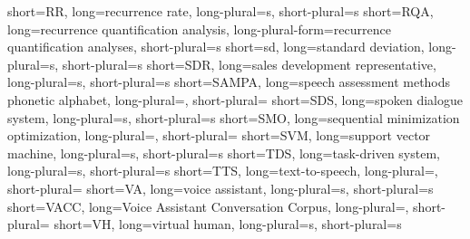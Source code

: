 		{short=RR,	 	long=recurrence rate,								long-plural=s, short-plural=s}
	{short=RQA,	 	long=recurrence quantification analysis,			long-plural-form=recurrence quantification analyses, short-plural=s}
		{short=sd, 		long=standard deviation, 							long-plural=s, short-plural=s}
	{short=SDR, 	long=sales development representative,				long-plural=s, short-plural=s}
	{short=SAMPA, 	long=speech assessment methods phonetic alphabet, 	long-plural=, short-plural=}
	{short=SDS, 	long=spoken dialogue system, 						long-plural=s, short-plural=s}
	{short=SMO, 	long=sequential minimization optimization, 			long-plural=, short-plural=}
	{short=SVM, 	long=support vector machine, 						long-plural=s, short-plural=s}
	{short=TDS, 	long=task-driven system,							long-plural=s, short-plural=s}
	{short=TTS, 	long=text-to-speech,								long-plural=, short-plural=}
		{short=VA, 		long=voice assistant, 								long-plural=s, short-plural=s}
	{short=VACC, 	long=Voice Assistant Conversation Corpus, 			long-plural=, short-plural=}
		{short=VH, 		long=virtual human, 								long-plural=s, short-plural=s}

\usepackage[	
	natbib=true,
	style=authoryear-comp,
	sorting=ynt, %
	hyperref=true,
	backend=biber,
	maxbibnames=99,
	giveninits=true,
	uniquename=false, %
	uniquelist=false,
	maxcitenames=2,
	mincitenames=1,
	parentracker=true,
	url=true,
	doi=true,
	isbn=true,
	eprint=true,
	backref=true,]
	{biblatex}


\newcommand \AlCentroPagina [1]{
    \AddToShipoutPicture *{\AtPageCenter {
            \makebox (0,0){\includegraphics
                [width=0.95\paperwidth]{#1}}}}}


